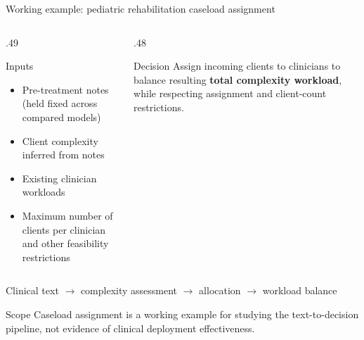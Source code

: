 \documentclass[aspectratio=169,11pt]{beamer}
\newcommand{\key}[1]{\textcolor{deepblue}{\textbf{#1}}}
\begin{document}
\begin{frame}{Working example: pediatric rehabilitation caseload assignment}

\begin{columns}[T,onlytextwidth]

\begin{column}{.49\textwidth}

\begin{block}{Inputs}
\begin{itemize}
\setlength{\itemsep}{5pt}

\item Pre-treatment notes (held fixed across compared models)

\item Client complexity inferred from notes

\item Existing clinician workloads

\item Maximum number of clients per clinician and other feasibility restrictions

\end{itemize}
\end{block}

\end{column}

\begin{column}{.48\textwidth}

\begin{block}{Decision}
Assign incoming clients to clinicians to balance resulting \key{total complexity workload}, while respecting assignment and client-count restrictions.
\end{block}

\end{column}

\end{columns}

\vspace{.2cm}

\begin{center}
\large
Clinical text $\rightarrow$ complexity assessment $\rightarrow$ allocation $\rightarrow$ workload balance
\end{center}

\begin{alertblock}{Scope}
Caseload assignment is a working example for studying the text-to-decision pipeline, not evidence of clinical deployment effectiveness.
\end{alertblock}

\end{frame}
\end{document}
